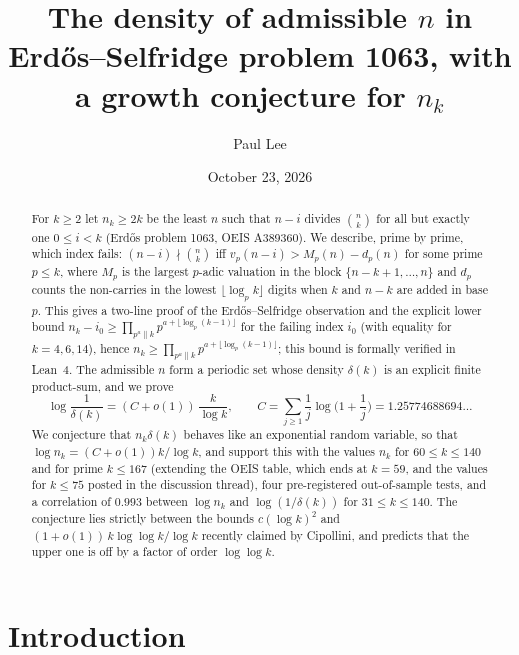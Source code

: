 \documentclass[11pt]{amsart}
\title[The density of admissible $n$ in Erd\H{o}s problem 1063]{The density of admissible $n$ in Erd\H{o}s--Selfridge problem 1063, with a growth conjecture for $n_k$}
\author{Paul Lee}
\date{October 23, 2026}
\theoremstyle{remark}
\begin{document}
\begin{abstract}
For $k\ge2$ let $n_k\ge2k$ be the least $n$ such that $n-i$ divides $\binom nk$ for all but exactly one $0\le i<k$ (Erd\H{o}s problem 1063, OEIS A389360). We describe, prime by prime, which index fails: $(n-i)\nmid\binom nk$ iff $v_p(n-i)>M_p(n)-d_p(n)$ for some prime $p\le k$, where $M_p$ is the largest $p$-adic valuation in the block $\{n-k+1,\dots,n\}$ and $d_p$ counts the non-carries in the lowest $\lfloor\log_pk\rfloor$ digits when $k$ and $n-k$ are added in base $p$. This gives a two-line proof of the Erd\H{o}s--Selfridge observation and the explicit lower bound $n_k-i_0\ge\prod_{p^a\|k}p^{a+\lfloor\log_p(k-1)\rfloor}$ for the failing index $i_0$ (with equality for $k=4,6,14$), hence $n_k\ge\prod_{p^a\|k}p^{a+\lfloor\log_p(k-1)\rfloor}$; this bound is formally verified in Lean~4. The admissible $n$ form a periodic set whose density $\delta(k)$ is an explicit finite product-sum, and we prove
\[\log\frac1{\delta(k)}=(C+o(1))\,\frac{k}{\log k},\qquad C=\sum_{j\ge1}\frac1j\log\Big(1+\frac1j\Big)=1.25774688694\ldots\]
We conjecture that $n_k\delta(k)$ behaves like an exponential random variable, so that $\log n_k=(C+o(1))k/\log k$, and support this with the values $n_k$ for $60\le k\le140$ and for prime $k\le167$ (extending the OEIS table, which ends at $k=59$, and the values for $k\le75$ posted in the discussion thread), four pre-registered out-of-sample tests, and a correlation of $0.993$ between $\log n_k$ and $\log(1/\delta(k))$ for $31\le k\le140$. The conjecture lies strictly between the bounds $c(\log k)^2$ and $(1+o(1))\,k\log\log k/\log k$ recently claimed by Cipollini, and predicts that the upper one is off by a factor of order $\log\log k$.
\end{abstract}

\maketitle

\section{Introduction}
\end{document}
